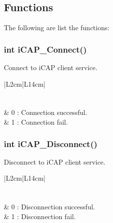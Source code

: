 \subsection{Functions}
The following are list the functions:
\subsubsection {{\color{blue}int} iCAP\_Connect()}
Connect to iCAP client service.
\begin{table}[H]
	\large
	\begin{tabular}{|L{2cm}|L{14cm}|}
		\hline
		\\
		\hline
		\\
		\hline
		\\
		\hline
		 & 0 : Connection successful.\\
										 & 1 : Connection fail.\\
		\hline
	\end{tabular}
\end{table}

\subsubsection {{\color{blue}int} iCAP\_Disconnect()}
Disconnect to iCAP client service.
\begin{table}[H]
	\large
	\begin{tabular}{|L{2cm}|L{14cm}|}
		\hline
		\\
		\hline
		\\
		\hline
		\\
		\hline
		 & 0 : Disconnection successful.\\
										 & 1 : Disconnection fail.\\
		\hline
	\end{tabular}
\end{table}

